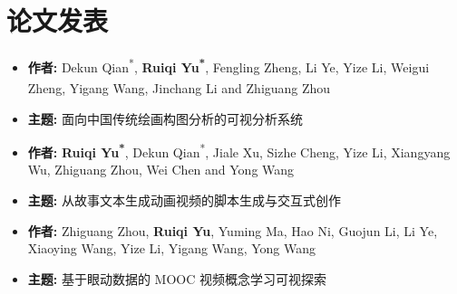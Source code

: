 \documentclass[AutoFakeBold]{resume}
\begin{document}
\section{\makebox[.75em][c]{\faPaste} \textbf{\fangsong 论文发表}}
\begin{itemize}
    \item \textbf{\kaishu 作者:} \kaishu Dekun Qian\textsuperscript{*}, \textbf{Ruiqi Yu\textsuperscript{*}}, Fengling Zheng\textsuperscript{\dag}, Li Ye, Yize Li, Weigui Zheng, Yigang Wang, Jinchang Li and Zhiguang Zhou\textsuperscript{\dag}
    \item \textbf{\kaishu 主题:} \kaishu 面向中国传统绘画构图分析的可视分析系统
\end{itemize}
\begin{itemize}
    \item \textbf{\kaishu 作者:} \kaishu \textbf{Ruiqi Yu\textsuperscript{*}}, Dekun Qian\textsuperscript{*}, Jiale Xu, Sizhe Cheng, Yize Li, Xiangyang Wu, Zhiguang Zhou, Wei Chen and Yong Wang
    \item \textbf{\kaishu 主题:} \kaishu 从故事文本生成动画视频的脚本生成与交互式创作
\end{itemize}
\begin{itemize}
    \item \textbf{\kaishu 作者:} \kaishu Zhiguang Zhou, \textbf{Ruiqi Yu}, Yuming Ma, Hao Ni, Guojun Li, Li Ye, Xiaoying Wang, Yize Li, Yigang Wang, Yong Wang
    \item \textbf{\kaishu 主题:} \kaishu 基于眼动数据的 MOOC 视频概念学习可视探索
\end{itemize}
\end{document}
